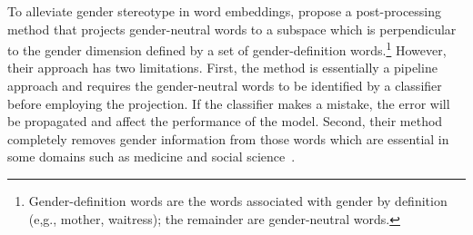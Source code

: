 


To alleviate gender stereotype in word embeddings,  propose a post-processing method that projects gender-neutral words to a subspace which is perpendicular to the gender dimension defined by a set of gender-definition words.\footnote{Gender-definition words are the words associated with gender by definition (e,g., mother, waitress); the remainder are gender-neutral words.} However, their approach has two limitations. First, the method is essentially a pipeline approach and requires the gender-neutral words to be identified by a classifier before employing the projection. If the classifier makes a mistake, the error will be propagated and affect the performance of the model. Second, 
their method completely removes gender information from those words which are essential in some domains such as medicine and social science~\cite{back2010gender,mcfadden1992study}.



